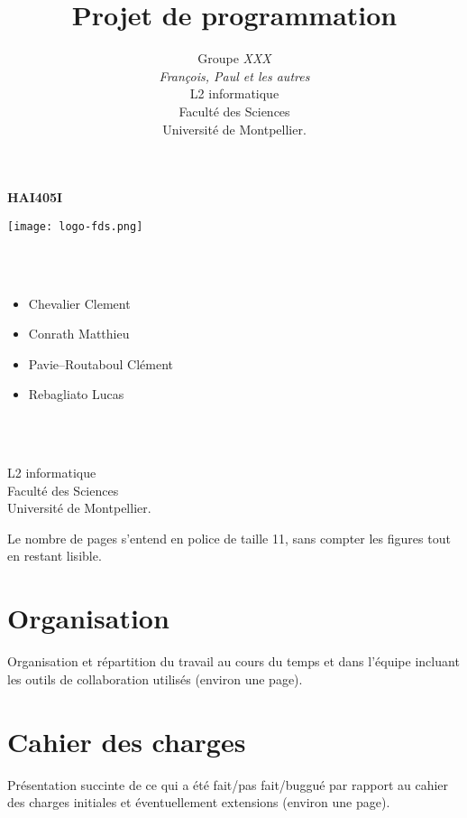 \documentclass[a4paper, 12pt]{article}
\title{         %
  Projet de programmation}
\author{Groupe \emph{XXX}\\
  \emph{François, Paul et les autres}\\
    L2 informatique\\
  Faculté des Sciences\\
Université de Montpellier.}
\begin{document}
\centerline{\Huge\bf HAI405I}
\vspace*{1.5cm}
\begin{center}               %
	
	
  \texttt{[image: logo-fds.png]}   %
	

\end{center}
\vspace*{1.5cm}


\vspace*{1.5cm}

\\ \\

\begin{itemize}\large
\item Chevalier Clement\large
\item Conrath Matthieu\large
\item Pavie--Routaboul Clément\large
\item Rebagliato Lucas\large
\end{itemize}
\\
\\
\vspace*{1.5cm}
\begin{center}
  L2 informatique\\
  Faculté des Sciences\\
Université de Montpellier.
\end{center}

\newpage
Le nombre de pages s'entend en police de taille 11, sans compter les figures tout en restant lisible.

\section{Organisation}

Organisation et répartition du travail au cours du temps et dans l'équipe incluant les outils de collaboration utilisés  (environ une page).

\section{Cahier des charges}

Présentation succinte  de ce qui a été fait/pas fait/buggué par rapport au cahier des charges initiales et éventuellement extensions (environ une page).
\end{document}
